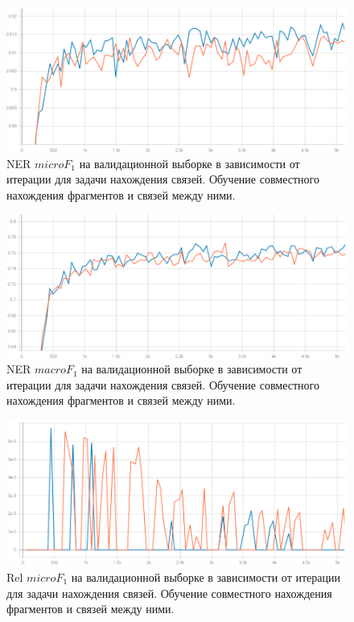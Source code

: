 \documentclass[12pt]{article}
\begin{document}
\begin{figure}[h]
    \centering
    \includegraphics[width=\textwidth]{images/ner_micro_f1.png}
    \caption{NER $micro F_1$ на валидационной выборке в зависимости от итерации для задачи нахождения связей. Обучение совместного нахождения фрагментов и связей между ними.}
    \label{fig:ner_micro_f}
\end{figure}

\begin{figure}[h]
    \centering
    \includegraphics[width=\textwidth]{images/ner_macro_f1.png}
    \caption{NER $macro F_1$ на валидационной выборке в зависимости от итерации для задачи нахождения связей. Обучение совместного нахождения фрагментов и связей между ними.}
    \label{fig:ner_macro_f}
\end{figure}

\begin{figure}[h]
    \centering
    \includegraphics[width=\textwidth]{images/hard_rel_f1.png}
    \caption{Rel $micro F_1$ на валидационной выборке в зависимости от итерации для задачи нахождения связей. Обучение совместного нахождения фрагментов и связей между ними.}
    \label{fig:ner_micro_f}
\end{figure}
\end{document}

